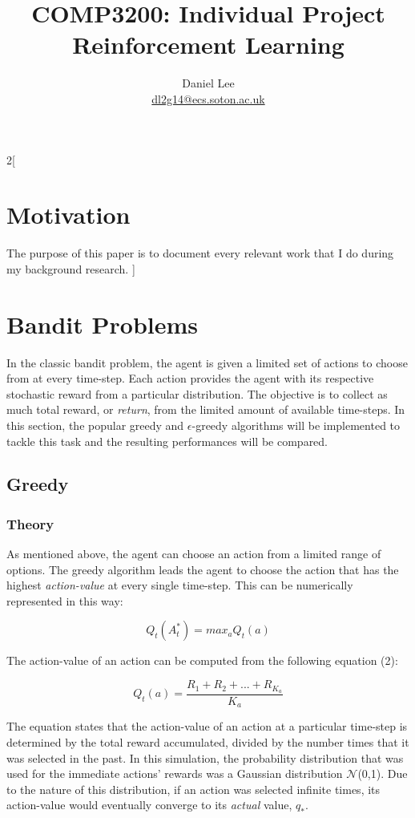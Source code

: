 \documentclass[a4paper]{article}
\title{COMP3200: Individual Project \\ Reinforcement Learning}
\author{Daniel Lee \\ \href{emailto: dl2g14@ecs.soton.ac.uk}{dl2g14@ecs.soton.ac.uk}}
\begin{document}
	\maketitle
	
	\begin{multicols}{2}[
		\section*{Motivation}
		The purpose of this paper is to document every relevant work that I do during my background research.
		]
		
		\section{Bandit Problems}
		In the classic bandit problem, the agent is given a limited set of actions to choose from at every time-step. Each action provides the agent with its respective stochastic reward from a particular distribution. The objective is to collect as much total reward, or \textit{return}, from the limited amount of available time-steps. In this section, the popular greedy and $\epsilon$-greedy algorithms will be implemented to tackle this task and the resulting performances will be compared.

		\subsection{Greedy}
		\subsubsection{Theory}
		As mentioned above, the agent can choose an action from a limited range of options. The greedy algorithm leads the agent to choose the action that has the highest \textit{action-value} at every single time-step. This can be numerically represented in this way: 
		
		\begin{equation}
			Q_t(A_t^*) = max_a Q_t(a)
		\end{equation}
		
		The action-value of an action can be computed from the following equation (2):
		
		\begin{equation}
			Q_t(a) = \frac{R_1 + R_2 + ... + R_{K_a}}{K_a}
		\end{equation}

		The equation states that the action-value of an action at a particular time-step is determined by the total reward accumulated, divided by the number times that it was selected in the past. In this simulation, the probability distribution that was used for the immediate actions' rewards was a Gaussian distribution $\mathcal{N}$(0,1). Due to the nature of this distribution, if an action was selected infinite times, its action-value would eventually converge to its \textit{actual} value, $q_*$.
		

\end{multicols}
\end{document}
